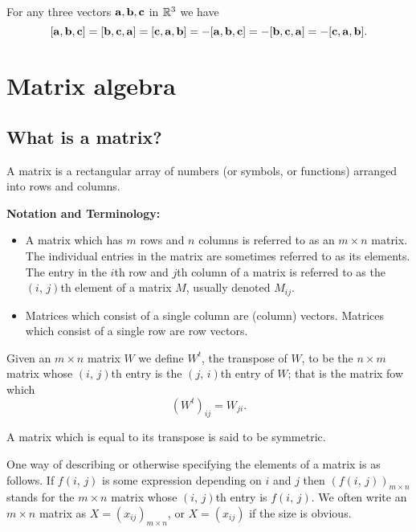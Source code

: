 \documentclass[10pt, a4paper]{article}
\begin{document}
\begin{lemma}
    For any three vectors $\mathbf{a, b, c}$ in $\mathbb{R} ^ 3$ we have
    \[
    [\mathbf{a, b, c}] = [\mathbf{b, c, a}] = [\mathbf{c, a, b}] = -[\mathbf{a, b, c}] = -[\mathbf{b, c, a}] = -[\mathbf{c, a, b}].
    \]
\end{lemma}

\section{Matrix algebra}

\subsection{What is a matrix?}

\begin{definition}[Matrix]
    A matrix is a rectangular array of numbers (or symbols, or functions) arranged into rows and columns.
\end{definition}

\textbf{Notation and Terminology:}
\begin{itemize}
    \item A matrix which has $m$ rows and $n$ columns is referred to as an $m \times n$ matrix. The individual entries in the matrix are sometimes referred to as its elements. The entry in the $i$th row and $j$th column of a matrix is referred to as the $(i,\,j)$th element of a matrix $M$, usually denoted $M_{ij}$.
    \item Matrices which consist of a single column are (column) vectors. Matrices which consist of a single row are row vectors.
\end{itemize}

\begin{definition}[Transpose]
    Given an $m \times n$ matrix $W$ we define $W ^ t$, the transpose of $W$, to be the $n \times m$ matrix whose $(i,\,j)$th entry is the $(j,\,i)$th entry of $W$; that is the matrix fow which
    \[
    (W ^ t)_{ij} = W_{ji}.
    \]
\end{definition}

A matrix which is equal to its transpose is said to be symmetric.

One way of describing or otherwise specifying the elements of a matrix is as follows. If $f(i,\,j)$ is some expression depending on $i$ and $j$ then $(f(i,\,j))_{m \times n}$ stands for the $m \times n$ matrix whose $(i,\,j)$th entry is $f(i,\,j)$. We often write an $m \times n$ matrix as $X = (x_{ij})_{m \times n}$, or $X = (x_{ij})$ if the size is obvious.
\end{document}
